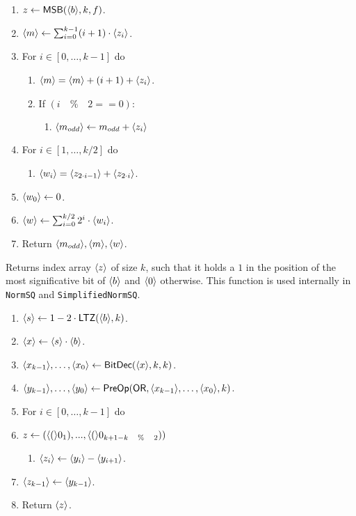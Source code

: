  \begin{enumerate}
    \item $z \leftarrow \mathsf{MSB}(\langle b \rangle,k,f)$.

    \item $\langle m \rangle \leftarrow \sum_{i=0}^{k-1} (i+1) \cdot \langle z_i \rangle$.
    \item For $i \in [0,\ldots,k-1]$ do
          \begin{enumerate}
            \item $\langle m \rangle=\langle m \rangle+ (i+1) +\langle z_{i} \rangle$.
            \item If $(i \quad \% \quad 2 == 0)$:
                  \begin{enumerate}
                    \item $\langle m_{odd} \rangle \leftarrow m_{odd} + \langle z_{i} \rangle$
                  \end{enumerate}
          \end{enumerate}
    \item For $i \in [1,\ldots,k/2]$ do
          \begin{enumerate}
            \item $\langle w_i \rangle=\langle z_{2\cdot i-1} \rangle+\langle z_{2\cdot i} \rangle$.
          \end{enumerate}
    \item $\langle w_0 \rangle \leftarrow 0$.
    \item $\langle w \rangle \leftarrow \sum_{i=0}^{k/2} 2^i \cdot \langle w_i \rangle$.

    \item Return $\langle m_{odd} \rangle, \langle m \rangle, \langle w \rangle$.
  \end{enumerate}

  Returns index array $\langle z \rangle$ of size $k$, such that it holds a $1$ in the position of the most significative bit of $\langle b \rangle$ and $\langle 0 \rangle$ otherwise. This function is used internally in \verb|NormSQ| and \verb|SimplifiedNormSQ|.
  \begin{enumerate}

    \item $\langle s \rangle \leftarrow 1-2 \cdot \mathsf{LTZ}(\langle b \rangle,k)$.
    \item $\langle x \rangle \leftarrow \langle s \rangle \cdot \langle b \rangle$.
    \item $\langle x_{k-1} \rangle,\ldots,\langle x_0 \rangle \leftarrow \mathsf{BitDec}(\langle x \rangle,k,k)$.
    \item $\langle y_{k-1} \rangle,\ldots,\langle y_0 \rangle \leftarrow \mathsf{PreOp}(\mathsf{OR},\langle x_{k-1} \rangle,\ldots,\langle x_0 \rangle,k)$.
    \item For $i \in [0,\ldots,k-1]$ do
    \item $z \leftarrow (\langle ( \rangle0_{1}),...,\langle ( \rangle0_{k + 1 - k \quad \% \quad 2}))$
          \begin{enumerate}
            \item $\langle z_i \rangle \leftarrow \langle y_i \rangle-\langle y_{i+1} \rangle$.
          \end{enumerate}
    \item $\langle z_{k-1} \rangle \leftarrow \langle y_{k-1} \rangle$.
    \item Return $\langle z \rangle$.
  \end{enumerate}


